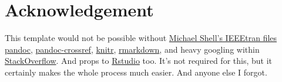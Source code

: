 \documentclass[a4paper,conference]{IEEEtran}
\begin{document}
\hypertarget{sec:acknowledgement}{%
\section*{Acknowledgement}\label{sec:acknowledgement}}

This template would not be possible without
\href{https://www.ctan.org/tex-archive/macros/latex/contrib/IEEEtran/?lang=en}{Michael
Shell's IEEEtran files} \href{http://pandoc.org/}{pandoc},
\href{https://github.com/lierdakil/pandoc-crossref}{pandoc-crossref},
\href{http://yihui.name/knitr/}{knitr},
\href{http://rmarkdown.rstudio.com/}{rmarkdown}, and heavy googling
within \href{http://stackoverflow.com/}{StackOverflow}. And props to
\href{https://www.rstudio.com/}{Rstudio} too. It's not required for
this, but it certainly makes the whole process much easier. And anyone
else I forgot.


\end{document}
